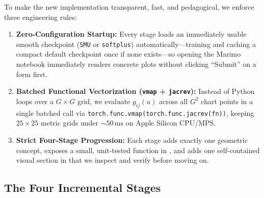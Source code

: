 \documentclass[11pt,a4paper]{article}
\theoremstyle{definition}
\begin{document}
To make the new implementation transparent, fast, and pedagogical, we enforce three engineering rules:
\begin{enumerate}[leftmargin=*]
    \item \textbf{Zero-Configuration Startup:} Every stage loads an immediately usable smooth checkpoint (\texttt{SMU} or \texttt{softplus}) automatically---training and caching a compact default checkpoint once if none exists---so opening the Marimo notebook immediately renders concrete plots without clicking ``Submit'' on a form first.
    \item \textbf{Batched Functional Vectorization (\texttt{vmap} + \texttt{jacrev}):} Instead of Python loops over a $G \times G$ grid, we evaluate $g_{ij}(u)$ across all $G^2$ chart points in a single batched call via \texttt{torch.func.vmap(torch.func.jacrev(fn))}, keeping $25 \times 25$ metric grids under $\sim 50\,\mathrm{ms}$ on Apple Silicon CPU/MPS.
    \item \textbf{Strict Four-Stage Progression:} Each stage adds exactly one geometric concept, exposes a small, unit-tested function in , and adds one self-contained visual section in  that we inspect and verify before moving on.
\end{enumerate}

\subsection{The Four Incremental Stages}
\end{document}
